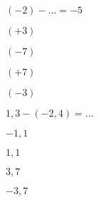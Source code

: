 \begin{QCM}
\begin{GroupeQCM}
    \begin{exercice}
      $(-2) - \ldots = -5$
      \begin{ChoixQCM}{4}
      \item $(+3)$
      \item $(-7)$
      \item $(+7)$
      \item $(-3)$
      \end{ChoixQCM}
\begin{corrige}
   \end{corrige}
    \end{exercice}


    \begin{exercice}
      $1,3 - (-2,4) = \ldots$
      \begin{ChoixQCM}{4}
      \item $-1,1$
      \item $1,1$
      \item $3,7$
      \item $-3,7$
      \end{ChoixQCM}
\begin{corrige}
   \end{corrige}
    \end{exercice}


\end{GroupeQCM}
\end{QCM}

\vfill
